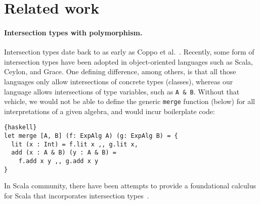 \section{Related work} \label{sec:related-work}






\paragraph{Intersection types with polymorphism.}

Intersection types date back to as early as Coppo et
al.~\cite{coppo1981functional}. Recently, some form of intersection types have
been adopted in object-oriented languages such as Scala, Ceylon, and Grace. One
defining difference, among others, is that all those languages only allow
intersections of concrete types (classes), whereas our language allows
intersections of type variables, such as \texttt{A \& B}. Without that vehicle,
we would not be able to define the generic \texttt{merge} function (below) for
all interpretations of a given algebra, and would incur boilerplate code:
\begin{lstlisting}{haskell}
let merge [A, B] (f: ExpAlg A) (g: ExpAlg B) = {
  lit (x : Int) = f.lit x ,, g.lit x,
  add (x : A & B) (y : A & B) =
    f.add x y ,, g.add x y
}
\end{lstlisting}
In Scala community, there have been attempts to provide a foundational calculus
for Scala that incorporates intersection
types~\cite{amin2014foundations,amin2012dependent}.

